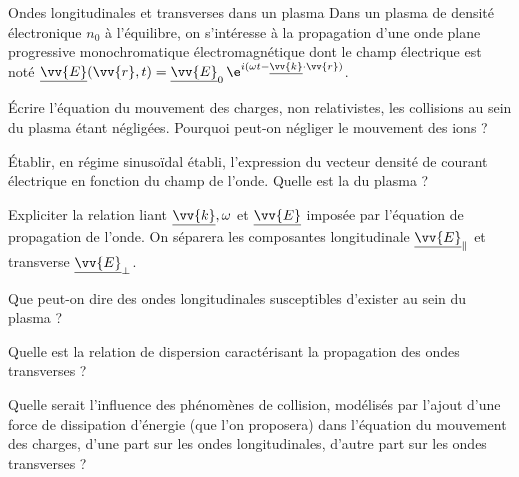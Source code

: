 \begin{exo}[PC]{Ondes longitudinales et transverses dans un plasma}
Dans un plasma de densité électronique $n_0$ à l'équilibre, on s'intéresse à la propagation d'une onde plane progressive monochromatique électromagnétique dont le champ électrique est noté $\underline{\vv{E}}(\vv{r},t)=\underline{\vv{E}}_0\,\e^{i(\omega t-\underline{\vv{k}}\cdot\vv{r})}$.
\begin{quest}
\item Écrire l'équation du mouvement des charges, non relativistes, les collisions au sein du plasma étant négligées. Pourquoi peut-on négliger le mouvement des ions ?
\item Établir, en régime sinusoïdal établi, l'expression du vecteur densité de courant électrique en fonction du champ de l'onde. Quelle est la  du plasma ?
\item Expliciter la relation liant $\underline{\vv{k}},\omega$ et $\underline{\vv{E}}$ imposée par l'équation de propagation de l'onde. On séparera les composantes longitudinale $\underline{\vv{E}}_{\parallel}$ et transverse $\underline{\vv{E}}_{\perp}$.
\item Que peut-on dire des ondes longitudinales susceptibles d'exister au sein du plasma ?
\item Quelle est la relation de dispersion caractérisant la propagation des ondes transverses ?
\item Quelle serait l'influence des phénomènes de collision, modélisés par l'ajout d'une force de dissipation d'énergie (que l'on proposera) dans l'équation du mouvement des charges, d'une part sur les ondes longitudinales, d'autre part sur les ondes transverses ?
\end{quest}
\end{exo}

